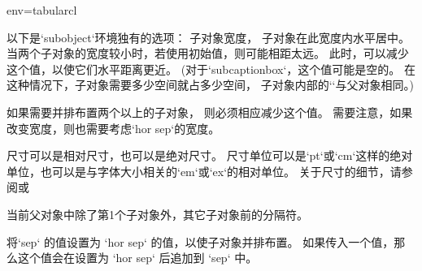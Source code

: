 \begin{tableobject}{env=tabular}{cl}



\endkeydoc

以下是`subobject`环境独有的选项：
  子对象宽度，
  子对象在此宽度内水平居中。
  当两个子对象的宽度较小时，若使用初始值，则可能相距太远。
  此时，可以减少这个值，以使它们水平距离更近。
  (对于`subcaptionbox`，这个值可能是空的。
  在这种情况下，子对象需要多少空间就占多少空间，
  子对象内部的`\linewidth`与父对象相同。)

  如果需要并排布置两个以上的子对象，
  则必须相应减少这个值。
  需要注意，如果改变宽度，则也需要考虑`hor sep`的宽度。

  尺寸可以是相对尺寸，也可以是绝对尺寸。
  尺寸单位可以是`pt`或`cm`这样的绝对单位，也可以是与字体大小相关的`em`或`ex`的相对单位。
  关于尺寸的细节，请参阅或

  当前父对象中除了第1个子对象外，其它子对象前的分隔符。

  将`sep` 的值设置为 `hor sep` 的值，以使子对象并排布置。
  如果传入一个值，那么这个值会在设置为 `hor sep` 后追加到 `sep` 中。


\end{tableobject}

